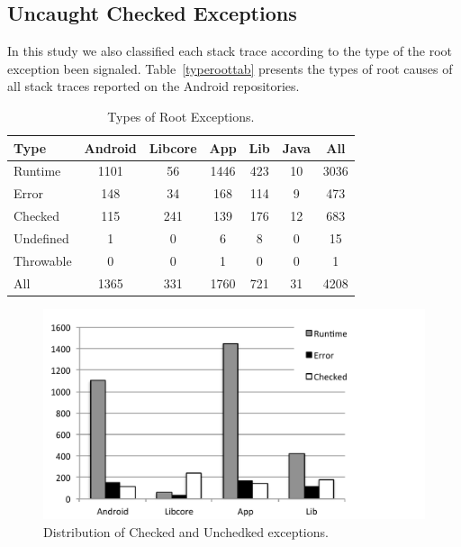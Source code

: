 \documentclass[conference]{IEEEtran}
\begin{document}
\subsection{Uncaught Checked Exceptions}

In this study we also classified each stack trace according to the type of the
root exception been signaled. Table~\ref{typeroottab} presents the types of root
causes of all stack traces reported on the Android repositories.

\begin{table}
\centering
\begin{tabular}{lcccccc}
    \hline
    \bfseries{Type} & \bfseries{Android} & \bfseries{Libcore} & \bfseries{App} & \bfseries{Lib} & \bfseries{Java} & \bfseries{All}\\
    \hline

Runtime   & 1101 & 56  & 1446 & 423 & 10 & 3036  \\
Error     & 148  & 34  & 168  & 114 & 9  & 473 \\
Checked   & 115  & 241 & 139  & 176 & 12 & 683 \\
Undefined & 1    & 0   & 6    & 8   & 0  & 15  \\
Throwable & 0    & 0   & 1    & 0   & 0  & 1 \\
    \hline
All       &	1365	&	331	&	1760	&	721	&	31	&	4208	\\
    \hline
  \end{tabular}
\caption{Types of Root Exceptions.}
  \label{fig:typeroottab}
\end{table}


\begin{figure}
\centering
\includegraphics[scale=0.3]{chart_exceptiontypes.pdf}
\caption{Distribution of Checked and Unchedked exceptions.}
\label{fig:typeroot}
\end{figure}
\end{document}
